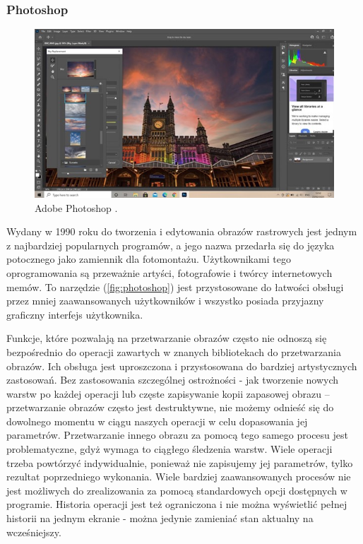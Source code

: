 \subsubsection{Photoshop}
\begin{figure}[H]
    \centering
    \includegraphics{./images/Picture2.jpg}
    \caption{Adobe Photoshop \cite{photoshop}.}
    \label{fig:photoshop}
\end{figure}

Wydany w 1990 roku do tworzenia i edytowania obrazów rastrowych jest jednym z najbardziej popularnych programów, a jego nazwa przedarła się do języka potocznego jako zamiennik dla fotomontażu. 
Użytkownikami tego oprogramowania są przeważnie artyści, fotografowie i twórcy internetowych memów. 
To narzędzie (\autoref{fig:photoshop}) jest przystosowane do łatwości obsługi przez mniej zaawansowanych użytkowników i wszystko posiada przyjazny graficzny interfejs użytkownika. 

Funkcje, które pozwalają na przetwarzanie obrazów często nie odnoszą się bezpośrednio do operacji zawartych w znanych bibliotekach do przetwarzania obrazów. 
Ich obsługa jest uproszczona i przystosowana do bardziej artystycznych zastosowań. 
Bez zastosowania szczególnej ostrożności - jak tworzenie nowych warstw po każdej operacji lub częste zapisywanie kopii zapasowej obrazu – przetwarzanie obrazów często jest destruktywne, nie możemy odnieść się do dowolnego momentu w ciągu naszych operacji w celu dopasowania jej parametrów. 
Przetwarzanie innego obrazu za pomocą tego samego procesu jest problematyczne, gdyż wymaga to ciągłego śledzenia warstw. Wiele operacji trzeba powtórzyć indywidualnie, ponieważ nie zapisujemy jej parametrów, tylko rezultat poprzedniego wykonania. Wiele bardziej zaawansowanych procesów nie jest możliwych do zrealizowania za pomocą standardowych opcji dostępnych w programie. Historia operacji jest też ograniczona i nie można wyświetlić pełnej historii na jednym ekranie - można jedynie zamieniać stan aktualny na wcześniejszy.

